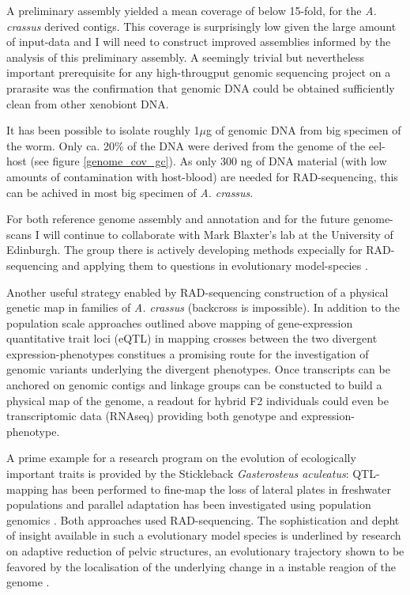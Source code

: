 A preliminary assembly yielded a mean coverage of below 15-fold, for
the \textit{A. crassus} derived contigs. This coverage is surprisingly
low given the large amount of input-data and I will need to construct
improved assemblies informed by the analysis of this preliminary
assembly. A seemingly trivial but nevertheless important prerequisite
for any high-througput genomic sequencing project on a prarasite was
the confirmation that genomic DNA could be obtained sufficiently clean
from other xenobiont DNA.


It has been possible to isolate roughly 1$\mu$g of genomic DNA from
big specimen of the worm. Only ca. 20\% of the DNA were derived from
the genome of the eel-host (see figure \ref{genome_cov_gc}). As only
300 ng of DNA material (with low amounts of contamination with
host-blood) are needed for RAD-sequencing, this can be achived in most
big specimen of \textit{A. crassus}.

For both reference genome assembly and annotation and for the future
genome-scans I will continue to collaborate with Mark Blaxter's lab at
the University of Edinburgh. The group there is actively developing
methods expecially for RAD-sequencing and applying them to questions
in evolutionary model-species \cite{pmid21681211}.

Another useful strategy enabled by RAD-sequencing construction of a
physical genetic map in families of \textit{A. crassus} (backcross is
impossible). In addition to the population scale approaches outlined
above mapping of gene-expression quantitative trait loci (eQTL) in
mapping crosses between the two divergent expression-phenotypes
constitues a promising route for the investigation of genomic variants
underlying the divergent phenotypes. Once transcripts can be anchored
on genomic contigs and linkage groups can be constucted to build a
physical map of the genome, a readout for hybrid F2 individuals could
even be transcriptomic data (RNAseq) providing both genotype and
expression-phenotype.

A prime example for a research program on the evolution of
ecologically important traits is provided by the Stickleback
\textit{Gasterosteus aculeatus}: QTL-mapping has been performed to
fine-map the loss of lateral plates in freshwater populations
\cite{pmid18852878} and parallel adaptation has been investigated
using population genomics \cite{pmid20195501}. Both approaches used
RAD-sequencing. The sophistication and depht of insight available in
such a evolutionary model species is underlined by research on
adaptive reduction of pelvic structures, an evolutionary trajectory
shown to be feavored by the localisation of the underlying change in a
instable reagion of the genome \cite{pmid20007865}.

